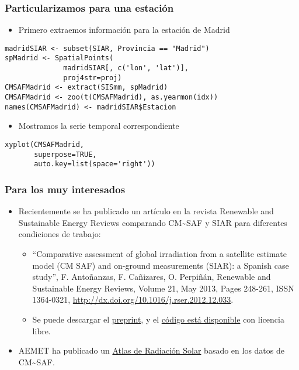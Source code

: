\documentclass[xcolor={usenames,svgnames,dvipsnames}]{beamer}
\begin{document}
\begin{frame}[fragile]
\frametitle{Particularizamos para una estación}
\label{sec-4-3}

\begin{itemize}
\item Primero extraemos información para la estación de Madrid
\end{itemize}

\lstset{language=R}
\begin{lstlisting}
madridSIAR <- subset(SIAR, Provincia == "Madrid")
spMadrid <- SpatialPoints(
              madridSIAR[, c('lon', 'lat')],
              proj4str=proj)
CMSAFMadrid <- extract(SISmm, spMadrid)
CMSAFMadrid <- zoo(t(CMSAFMadrid), as.yearmon(idx))
names(CMSAFMadrid) <- madridSIAR$Estacion
\end{lstlisting}
\begin{itemize}
\item Mostramos la serie temporal correspondiente
\end{itemize}

\lstset{language=R}
\begin{lstlisting}
xyplot(CMSAFMadrid,
       superpose=TRUE,
       auto.key=list(space='right'))
\end{lstlisting}
\end{frame}
\begin{frame}
\frametitle{Para los muy interesados}
\label{sec-4-4}


\begin{itemize}
\item Recientemente se ha publicado un artículo en la revista Renewable
  and Sustainable Energy Reviews comparando CM\~{}SAF y SIAR para
  diferentes condiciones de trabajo:
\begin{itemize}
\item ``Comparative assessment of global irradiation from a satellite
    estimate model (CM SAF) and on-ground measurements (SIAR): a
    Spanish case study'', F. Antoñanzas, F. Cañizares, O. Perpiñán, Renewable
    and Sustainable Energy Reviews, Volume 21, May 2013, Pages 248-261,
    ISSN 1364-0321, \href{http://dx.doi.org/10.1016/j.rser.2012.12.033}{http://dx.doi.org/10.1016/j.rser.2012.12.033}.
\item Se puede descargar el \href{http://procomun.files.wordpress.com/2012/12/cmsaf_siar_rev1.pdf}{preprint}, y el \href{https://github.com/oscarperpinan/CMSAF-SIAR}{código está disponible} con
    licencia libre.
\end{itemize}
\item AEMET ha publicado un \href{http://www.aemet.es/es/noticias/2012/05/atlasradiacionsolar}{Atlas de Radiación Solar} basado en los datos
  de CM\~{}SAF.
\end{itemize}
\end{frame}
\end{document}
